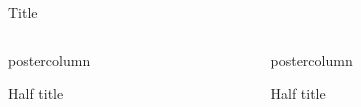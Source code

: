 \documentclass{beamer}
\begin{document}
\begin{frame}
\vspace{1.2ex}
\begin{NRCGblock}{Title}
\blindtext
\cite{Doe11} \cite{JohSil05} \cite{Joh11}
\end{NRCGblock}
\vspace{1.2ex}

\begin{columns}[t]
	\begin{column}{.47\textwidth}
		\begin{beamercolorbox}[center,wd=\textwidth]{postercolumn}
			\begin{NRCGblock}[equal height group=B]{Half title}
				\blindtext
			\end{NRCGblock}\vfill
		\end{beamercolorbox}
	\end{column}
	\hspace{12pt}
	\begin{column}{.47\textwidth}
		\begin{beamercolorbox}[center,wd=\textwidth]{postercolumn}
			\begin{NRCGblock}[equal height group=B]{Half title}
				\blindtext
			\end{NRCGblock}
		\end{beamercolorbox}
	\end{column}
\end{columns}

\vspace{1.5ex}


\end{frame}
\end{document}
